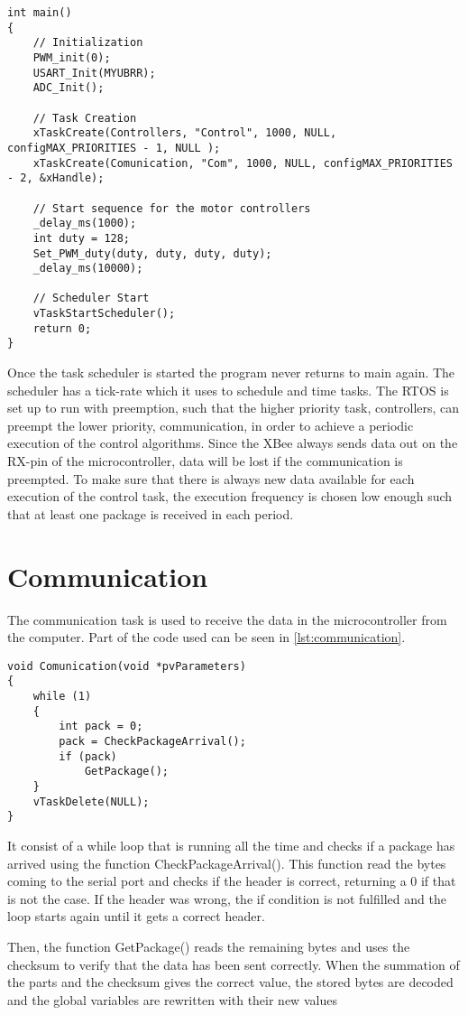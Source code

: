 \begin{lstlisting}[style=customcpp,
                    caption={Code for initialization, creation of the different tasks, start sequence for the motors and call to the scheduler.}, 
                    label=lst:scheduler]
int main()
{
    // Initialization
    PWM_init(0);
    USART_Init(MYUBRR);
    ADC_Init();
    
    // Task Creation
    xTaskCreate(Controllers, "Control", 1000, NULL, configMAX_PRIORITIES - 1, NULL );
    xTaskCreate(Comunication, "Com", 1000, NULL, configMAX_PRIORITIES - 2, &xHandle);
    
    // Start sequence for the motor controllers
    _delay_ms(1000);
    int duty = 128;
    Set_PWM_duty(duty, duty, duty, duty);
    _delay_ms(10000);
 
    // Scheduler Start
    vTaskStartScheduler();
    return 0;
}
\end{lstlisting}

Once the task scheduler is started the program never returns to main again. The scheduler has a tick-rate which it uses to schedule and time tasks. The RTOS is set up to run with preemption, such that the higher priority task, controllers, can preempt the lower priority, communication, in order to achieve a periodic execution of the control algorithms. Since the XBee always sends data out on the RX-pin of the microcontroller, data will be lost if the communication is preempted. To make sure that there is always new data available for each execution of the control task, the execution frequency is chosen low enough such that at least one package is received in each period.

\section{Communication}
The communication task is used to receive the data in the microcontroller from the computer. Part of the code used can be seen in \autoref{lst:communication}.

\begin{lstlisting}[style=customcpp,
                caption={Code for the comunication task.}, 
                label=lst:communication]
void Comunication(void *pvParameters)
{
    while (1)
    {
        int pack = 0;
        pack = CheckPackageArrival();
        if (pack)
            GetPackage();
    }
    vTaskDelete(NULL);
}
\end{lstlisting}

It consist of a while loop that is running all the time and checks if a package has arrived using the function CheckPackageArrival(). This function read the bytes coming to the serial port and checks if the header is correct, returning a 0 if that is not the case. If the header was wrong, the if condition is not fulfilled and the loop starts again until it gets a correct header.

Then, the function GetPackage() reads the remaining bytes and uses the checksum to verify that the data has been sent correctly. When the summation of the parts and the checksum gives the correct value, the stored bytes are decoded and the global variables are rewritten with their new values


